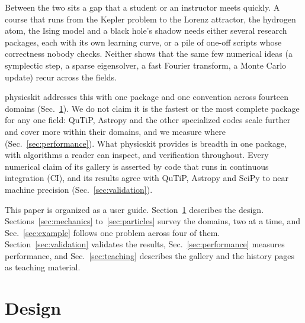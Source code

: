 \documentclass[11pt,a4paper]{article}
\begin{document}
Between the two sits a gap that a student or an instructor meets quickly.
A course that runs from the Kepler problem to the Lorenz attractor, the
hydrogen atom, the Ising model and a black hole's shadow needs either
several research packages, each with its own learning curve, or a pile of
one-off scripts whose correctness nobody checks. Neither shows that the
same few numerical ideas (a symplectic step, a sparse eigensolver, a fast
Fourier transform, a Monte Carlo update) recur across the fields.

physicskit addresses this with one package and one convention across
fourteen domains (Sec.~\ref{sec:design}). We do not claim it is the
fastest or the most complete package for any one field: QuTiP, Astropy and
the other specialized codes scale further and cover more within their
domains, and we measure where (Sec.~\ref{sec:performance}). What physicskit
provides is breadth in one package, with algorithms a reader can inspect,
and verification throughout. Every numerical claim of its gallery is
asserted by code that runs in continuous integration (CI), and its results
agree with QuTiP, Astropy and SciPy to near machine precision
(Sec.~\ref{sec:validation}).

This paper is organized as a user guide. Section~\ref{sec:design}
describes the design. Sections~\ref{sec:mechanics} to~\ref{sec:particles}
survey the domains, two at a time, and Sec.~\ref{sec:example} follows one
problem across four of them. Section~\ref{sec:validation} validates the
results, Sec.~\ref{sec:performance} measures performance, and
Sec.~\ref{sec:teaching} describes the gallery and the history pages as
teaching material.

\section{Design}
\label{sec:design}
\end{document}
